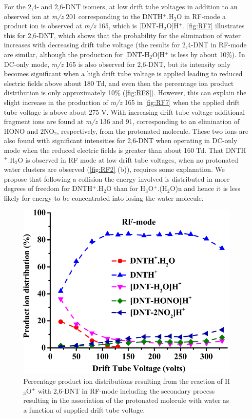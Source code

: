 For the 2,4- and 2,6-DNT isomers, at low drift tube voltages in addition to an observed ion at \textit{m/z} 201 corresponding to the DNTH$^+$.H$_2$O in RF-mode a product ion is observed at \textit{m/z} 165, which is [DNT-H$_2$O]H$^+$. \autoref{fig:RF7} illustrates this for 2,6-DNT, which shows that the probability for the elimination of water increases with decreasing drift tube voltage (the results for 2,4-DNT in RF-mode are similar, although the production for [DNT-H$_2$O]H$^+$ is less by about 10\%). In DC-only mode, \textit{m/z} 165 is also observed for 2,6-DNT, but its intensity only becomes significant when a high drift tube voltage is applied leading to reduced electric fields above about 180 Td, and even then the percentage ion product distribution is only approximately 10\% (\autoref{fig:RF8}). However, this can explain the slight increase in the production of \textit{m/z} 165 in \autoref{fig:RF7} when the applied drift tube voltage is above about 275 V. With increasing drift tube voltage additional fragment ions are found at \textit{m/z} 136 and 91, corresponding to an elimination of HONO and 2NO$_2$, respectively, from the protonated molecule. These two ions are also found with significant intensities for 2,6-DNT when operating in DC-only mode when the reduced electric fields is greater than about 160 Td. That DNTH$^+$.H$_2$O is observed in RF mode at low drift tube voltages, when no protonated water clusters are observed (\autoref{fig:RF2} (b)), requires some explanation. We propose that following a collision the energy involved is distributed in more degrees of freedom for DNTH$^+$.H$_2$O than for H$_3$O$^+$.(H$_2$O)n and hence it is less likely for energy to be concentrated into losing the water molecule.

\begin{figure}%
\centering
\includegraphics[height=0.3\textheight]{pics/RFpaper_fig7.png}
\caption{Percentage product ion distributions resulting from the reaction of H$_3$O$^+$ with 2,6-DNT in RF-mode including the secondary process resulting in the association of the protonated molecule with water as a function of supplied drift tube voltage.}
\label{fig:RF7}
\end{figure}

